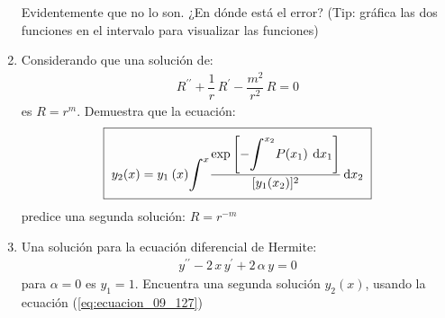 \documentclass[hidelinks,12pt]{article}
\def\scaleint#1{\vcenter{\hbox{\scaleto[3ex]{\displaystyle\int}{#1}}}}
\newcommand{\pderivada}[1]{\ensuremath{{#1}^{\prime}}}
\newcommand{\sderivada}[1]{\ensuremath{{#1}^{\prime \prime}}}
\begin{document}
\begin{enumerate}
Evidentemente que no lo son. ¿En dónde está el error? (Tip: gráfica las dos funciones en el intervalo para visualizar las funciones)
\item Considerando que una solución de:
\begin{align*}
\sderivada{R} + \dfrac{1}{r} \, \pderivada{R} - \dfrac{m^{2}}{r^{2}} \, R = 0
\end{align*}
es $R = r^{m}$. Demuestra que la ecuación:
\begin{align}
\setlength{\fboxsep}{2\fboxsep}\boxed{y_{2} (x) =  y_{1} \: (x) \scaleint{6ex}^{x} \dfrac{\exp \left[ \displaystyle - \scaleint{6ex}^{x_{2}} P (x_{1}) \: \dd{x_{1}} \right]}{[y_{1} (x_{2})]^{2}} \dd{x_{2}}}
\label{eq:ecuacion_09_127}
\end{align}
predice una segunda solución: $R = r^{-m}$
\item Una solución para la ecuación diferencial de Hermite:
\begin{align*}
\sderivada{y} - 2 \, x \, \pderivada{y} + 2 \, \alpha \, y = 0
\end{align*}
para $\alpha = 0$ es $y_{1} = 1$. Encuentra una segunda solución $y_{2} (x)$, usando la ecuación (\ref{eq:ecuacion_09_127})
\end{enumerate}
\end{document}
